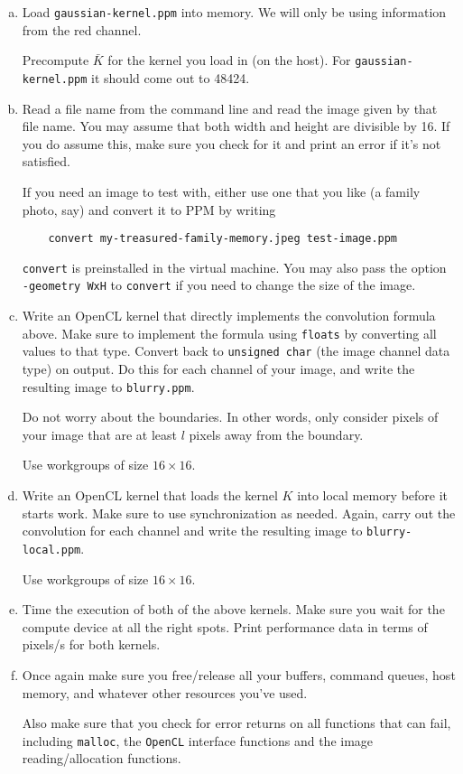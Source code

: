 \begin{enumerate}[a)]
  \item Load \texttt{gaussian-kernel.ppm} into memory. We will only be
    using information from the red channel.

    Precompute $\bar K$ for the kernel you load in (on the host). For
    \texttt{gaussian-kernel.ppm} it should come out to 48424.

  \item Read a file name from the command line and read the image
    given by that file name. You may assume that both width and height
    are divisible by 16. If you do assume this, make sure you check
    for it and print an error if it's not satisfied.

    If you need an image to test with, either use one that you like (a
    family photo, say) and convert it to PPM by writing
    \begin{lstlisting}
    convert my-treasured-family-memory.jpeg test-image.ppm
    \end{lstlisting}
    \texttt{convert} is preinstalled in the virtual machine. You may
    also pass the option \texttt{-geometry WxH} to \texttt{convert}
    if you need to change the size of the image.
  \item Write an OpenCL kernel that directly implements the
    convolution formula above. Make sure to implement the formula
    using \texttt{floats} by converting all values to that type.
    Convert back to \texttt{unsigned char} (the image channel data
    type) on output. Do this for each channel of your image,
    and write the resulting image to \texttt{blurry.ppm}.

    Do not worry about the boundaries. In other words, only consider
    pixels of your image that are at least $l$ pixels away from the
    boundary.

    Use workgroups of size $16\times 16$.
  \item Write an OpenCL kernel that loads the kernel $K$ into local
    memory before it starts work. Make sure to use synchronization as
    needed. Again, carry out the convolution for each channel
    and write the resulting image to \texttt{blurry-local.ppm}.

    Use workgroups of size $16\times 16$.

  \item Time the execution of both of the above kernels. Make sure you
    wait for the compute device at all the right spots. Print
    performance data in terms of pixels/s for both kernels.
  \item Once again make sure you free/release all your buffers,
    command queues, host memory, and whatever other resources you've
    used.

    Also make sure that you check for error returns on all functions
    that can fail, including \texttt{malloc}, the \texttt{OpenCL}
    interface functions and the image reading/allocation functions.
\end{enumerate}

